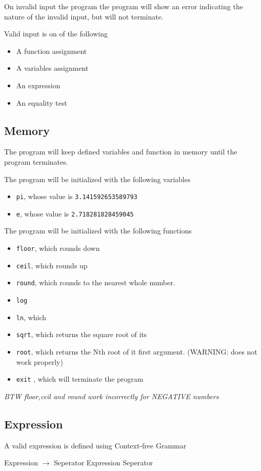 \documentclass[11pt,a4paper]{article}
\begin{document}
On invalid input the program the program will show an error
indicating the nature of the invalid input, but will not terminate.

Valid input is on of the following
\begin{itemize}
\item A function assignment
\item A variables assignment
\item An expression
\item An equality test
\end{itemize}
\subsection{Memory}
The program will keep defined variables and function in memory
until the program terminates.


The program will be initialized with the following variables
\begin{itemize}
\item \texttt{pi}, whose value is \texttt{3.141592653589793}
\item \texttt{e}, whose value is \texttt{2.718281828459045}
\end{itemize}

The program will be initialized with the following functions
\begin{itemize}
\item \texttt{floor}, which rounds down
\item \texttt{ceil}, which rounds up
\item \texttt{round}, which rounds to the nearest  whole number.
\item \texttt{log}
\item \texttt{ln}, which
\item \texttt{sqrt}, which returns the square root of its
\item \texttt{root}, which returns the Nth root of it first argument.  (WARNING: does not work properly)
\item \texttt{exit} , which will terminate the program
\end{itemize}


\emph{BTW floor,ceil and round work incorrectly for NEGATIVE numbers}
\subsection{Expression}
A valid expression is defined using Context-free Grammar

Expression \(\rightarrow\) Seperator Expression Seperator
\end{document}
